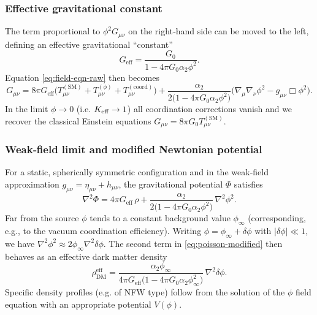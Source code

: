 \documentclass[12pt,a4paper]{article}
\newcommand{\Keff}[1][]{K_{\mathrm{eff}\if\relax\detokenize{#1}\relax\else,#1\fi}}   %
\begin{document}
	\subsubsection{Effective gravitational constant}
	The term proportional to $\phi^2 G_{\mu\nu}$ on the right‑hand side can be moved to the left, defining an effective gravitational “constant”
	\begin{equation}
		G_{\text{eff}} = \frac{G_0}{1 - 4\pi G_0\alpha_2\phi^2}.
		\label{eq:Geff}
	\end{equation}
	Equation \eqref{eq:field-eqn-raw} then becomes
	\begin{equation}
		G_{\mu\nu} = 8\pi G_{\text{eff}}\Big( T_{\mu\nu}^{(\text{SM})} + T_{\mu\nu}^{(\phi)} + T_{\mu\nu}^{(\text{coord})} \Big) + \frac{\alpha_2}{2\big(1-4\pi G_0\alpha_2\phi^2\big)}\Big( \nabla_\mu\nabla_\nu\phi^2 - g_{\mu\nu}\Box\phi^2 \Big).
		\label{eq:field-eqn-final}
	\end{equation}
	In the limit $\phi\to0$ (i.e. $\Keff\to1$) all coordination corrections vanish and we recover the classical Einstein equations $G_{\mu\nu}=8\pi G_0 T_{\mu\nu}^{(\text{SM})}$.
	
	\subsubsection{Weak‑field limit and modified Newtonian potential}
	For a static, spherically symmetric configuration and in the weak‑field approximation $g_{\mu\nu}=\eta_{\mu\nu}+h_{\mu\nu}$, the gravitational potential $\Phi$ satisfies
	\begin{equation}
		\nabla^2\Phi = 4\pi G_{\text{eff}}\,\rho + \frac{\alpha_2}{2\big(1-4\pi G_0\alpha_2\phi^2\big)}\,\nabla^2\phi^2.
		\label{eq:poisson-modified}
	\end{equation}
	Far from the source $\phi$ tends to a constant background value $\phi_\infty$ (corresponding, e.g., to the vacuum coordination efficiency). Writing $\phi = \phi_\infty + \delta\phi$ with $|\delta\phi|\ll1$, we have $\nabla^2\phi^2 \approx 2\phi_\infty\nabla^2\delta\phi$. The second term in \eqref{eq:poisson-modified} then behaves as an effective dark matter density
	\begin{equation}
		\rho_{\text{DM}}^{\text{eff}} = \frac{\alpha_2\phi_\infty}{4\pi G_{\text{eff}}\big(1-4\pi G_0\alpha_2\phi_\infty^2\big)}\,\nabla^2\delta\phi.
		\label{eq:dark-matter-density}
	\end{equation}
	Specific density profiles (e.g. of NFW type) follow from the solution of the $\phi$ field equation with an appropriate potential $V(\phi)$.
	
\end{document}
